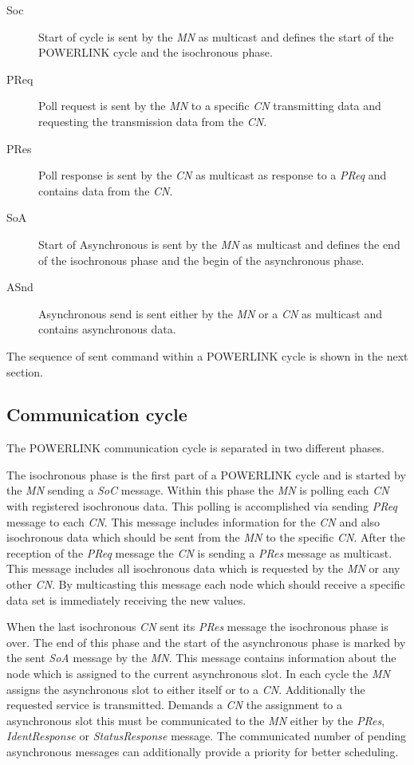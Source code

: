 \begin{description}
    \item[Soc] Start of cycle is sent by the \emph{MN} as multicast and defines the start of the POWERLINK cycle and the isochronous phase.
    \item[PReq] Poll request is sent by the \emph{MN} to a specific \emph{CN} transmitting data and requesting the transmission data from the \emph{CN}.
    \item[PRes] Poll response is sent by the \emph{CN} as multicast as response to a \emph{PReq} and contains data from the \emph{CN}.
    \item[SoA] Start of Asynchronous is sent by the \emph{MN} as multicast and defines the end of the isochronous phase and the begin of the asynchronous phase.
    \item[ASnd] Asynchronous send is sent either by the \emph{MN} or a \emph{CN} as multicast and contains asynchronous data.
\end{description}

The sequence of sent command within a POWERLINK cycle is shown in the next section.

\subsection{Communication cycle}
\label{sec:oplk_powerlink_commcycle}

The POWERLINK communication cycle is separated in two different phases.

The isochronous phase is the first part of a POWERLINK cycle and is started by the \emph{MN} sending a \emph{SoC} message.
Within this phase the \emph{MN} is polling each \emph{CN} with registered isochronous data.
This polling is accomplished via sending \emph{PReq} message to each \emph{CN}.
This message includes information for the \emph{CN} and also isochronous data which should be sent from the \emph{MN} to the specific \emph{CN}.
After the reception of the \emph{PReq} message the \emph{CN} is sending a \emph{PRes} message as multicast.
This message includes all isochronous data which is requested by the \emph{MN} or any other \emph{CN}.
By multicasting this message each node which should receive a specific data set is immediately receiving the new values. \cite[section 4.2.4.1.1]{epsg_epsg_2013}

When the last isochronous \emph{CN} sent its \emph{PRes} message the isochronous phase is over.
The end of this phase and the start of the asynchronous phase is marked by the sent \emph{SoA} message by the \emph{MN}.
This message contains information about the node which is assigned to the current asynchronous slot.
In each cycle the \emph{MN} assigns the asynchronous slot to either itself or to a \emph{CN}.
Additionally the requested service is transmitted.
Demands a \emph{CN} the assignment to a asynchronous slot this must be communicated to the \emph{MN} either by the \emph{PRes}, \emph{IdentResponse} or \emph{StatusResponse} message.
The communicated number of pending asynchronous messages can additionally provide a priority for better scheduling. \cite[section 4.2.4.1.2]{epsg_epsg_2013}


